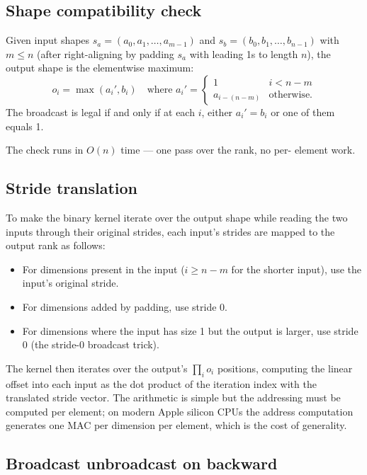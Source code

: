 \subsection{Shape compatibility check}
\label{ssec:binary_functions:compat_check}

Given input shapes $s_a = (a_0, a_1, \ldots, a_{m-1})$ and
$s_b = (b_0, b_1, \ldots, b_{n-1})$ with $m \leq n$ (after
right-aligning by padding $s_a$ with leading 1s to length $n$),
the output shape is the elementwise maximum:
\[
o_i = \max(a_i', b_i) \quad \text{where } a_i' = \begin{cases}
1 & i < n - m \\
a_{i - (n-m)} & \text{otherwise}.
\end{cases}
\]
The broadcast is legal if and only if at each $i$, either
$a_i' = b_i$ or one of them equals 1.

The check runs in $O(n)$ time --- one pass over the rank, no per-
element work.

\subsection{Stride translation}
\label{ssec:binary_functions:stride_xlate}

To make the binary kernel iterate over the output shape while
reading the two inputs through their original strides, each
input's strides are mapped to the output rank as follows:

\begin{itemize}
  \item For dimensions present in the input
    (\(i \geq n - m\) for the shorter input), use the input's
    original stride.
  \item For dimensions added by padding, use stride 0.
  \item For dimensions where the input has size 1 but the output
    is larger, use stride 0 (the stride-0 broadcast trick).
\end{itemize}

The kernel then iterates over the output's $\prod_i o_i$ positions,
computing the linear offset into each input as the dot product of
the iteration index with the translated stride vector. The
arithmetic is simple but the addressing must be computed per
element; on modern Apple silicon CPUs the address computation
generates one MAC per dimension per element, which is the cost
of generality.

\subsection{Broadcast unbroadcast on backward}
\label{ssec:binary_functions:unbroadcast_algo}

